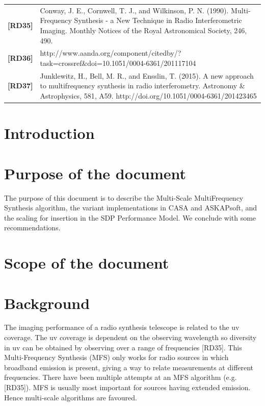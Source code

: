 \documentclass[11pt,a4paper,variablewidth]{article}
\begin{document}
\begin{center}
\begin{tabularx}{\textwidth}{|l|X|}
   {\bf [RD35]} & Conway, J. E., Cornwell, T. J., and Wilkinson, P. N. (1990). Multi-Frequency Synthesis - a New Technique in Radio Interferometric Imaging. Monthly Notices of the Royal Astronomical Society, 246, 490.\\
   {\bf [RD36]} & http://www.aanda.org/component/citedby/?task=crossref\&doi=10.1051/0004-6361/201117104 \\  
   {\bf [RD37]} & Junklewitz, H., Bell, M. R., and Ensslin, T. (2015). A new approach to multifrequency synthesis in radio interferometry. Astronomy \& Astrophysics, 581, A59. http://doi.org/10.1051/0004-6361/201423465 \\
   \hline
 \end{tabularx}
\end{center}

\newpage
\section{Introduction}

\clearpage
\section{Purpose of the document}


The purpose of this document is to describe the Multi-Scale MultiFrequency Synthesis algorithm, the variant implementations in CASA and ASKAPsoft, and the scaling for insertion in the SDP Performance Model. We conclude with some recommendations.

\clearpage
\section{Scope of the document}

\clearpage
\section{Background}

The imaging performance of a radio synthesis telescope is related to the uv coverage. The uv coverage is dependent on the observing wavelength so diversity in uv can be obtained by observing over a range of frequencies [RD35]. This Multi-Frequency Synthesis (MFS) only works for radio sources in which broadband emission is present, giving a way to relate measurements at different frequencies. There have been multiple attempts at an MFS algorithm (e.g. [RD35]). MFS is usually most important for sources having extended emission. Hence multi-scale algorithms are favoured.
\end{document}
